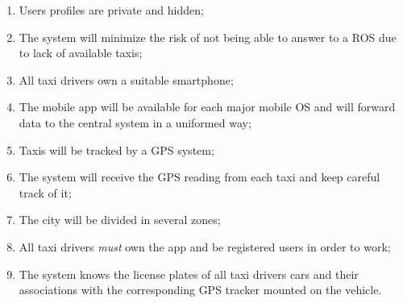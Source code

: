 \begin{enumerate}

\item Users profiles are private and hidden;
\item The system will minimize the risk of not being able to answer to a ROS due to lack of available taxis;
\item All taxi drivers own a suitable smartphone;
\item The mobile app will be available for each major mobile OS and will forward data to the central system in a uniformed way;
\item Taxis will be tracked by a GPS system;
\item The system will receive the GPS reading from each taxi and keep careful track of it;
\item The city will be divided in several zones;
\item All taxi drivers \emph{must} own the \mts{} app and be registered users in order to work;
\item The system knows the license plates of all taxi drivers cars and their associations with the corresponding GPS tracker mounted on the vehicle.
\end{enumerate}